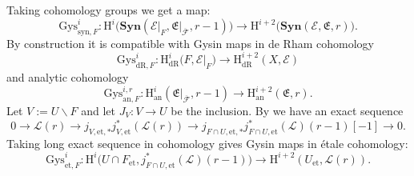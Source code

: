 \documentclass[asterisque,english]{smfart}
\begin{document}
Taking cohomology groups we get a map:
$$\mathrm{Gys}_{\mathrm{syn},F}^i\colon \mathrm{H}^i\bigl(\mathbf{Syn}(\mathcal{E}\vert_F,\mathfrak{E}\vert_{\mathcal{\overline{F}}},r-1) \bigr) \longrightarrow \mathrm{H}^{i+2}\bigl(\mathbf{Syn}(\mathcal{E},\mathfrak{E},r)\bigr).$$By construction it is compatible with Gysin maps in de Rham cohomology 
$$ \mathrm{Gys}_{\mathrm{dR},F}^i\colon \mathrm{H}^{i}_{\mathrm{dR}}\bigl(F,\mathcal{E}\vert_F\bigr)\longrightarrow  \mathrm{H}^{i+2}_{\mathrm{dR}}(X,\mathcal{E})$$and analytic cohomology 
$$ \mathrm{Gys}_{\mathrm{an},F}^{i,r}\colon \mathrm{H}^i_{\mathrm{an}}(\mathfrak{E}\vert_{\mathcal{\overline{F}}},r-1) \longrightarrow \mathrm{H}^{i+2}_{\mathrm{an}}(\mathfrak{E},r).$$Let $V:=U\backslash F$ and let $J_V\colon V\to U$ be the inclusion. By \cite[Thm. 7.2]{Illusie} we have an exact  sequence $$ 0 \to \mathcal{L}(r) \longrightarrow j_{V,\mathrm{et},\ast} j_{V,\mathrm{et}}^\ast(\mathcal{L}(r)) \longrightarrow j_{F\cap U,\mathrm{et},\ast} j_{F\cap U,\mathrm{et}}^\ast (\mathcal{L})(r-1)[-1] \to 0.$$Taking long exact sequence in cohomology gives  Gysin maps in \'etale cohomology: 
$$ \mathrm{Gys}_{\mathrm{et},F}^i\colon \mathrm{H}^{i}\bigl(U\cap F_{\mathrm{et}}, j_{F\cap U,\mathrm{et}}^\ast (\mathcal{L})(r-1)\bigr) \longrightarrow \mathrm{H}^{i+2}(U_{\mathrm{et}},\mathcal{L}(r)).$$
\end{document}

